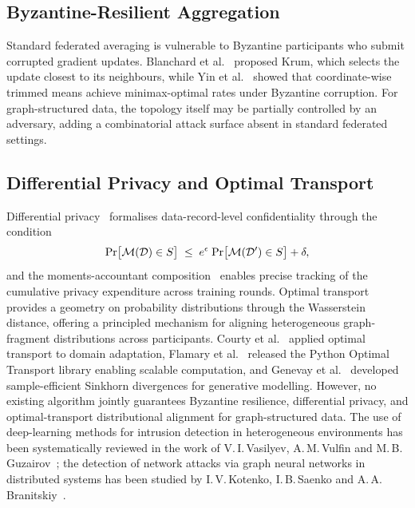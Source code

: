 \subsection{Byzantine-Resilient Aggregation}

Standard federated averaging is vulnerable to Byzantine participants who submit corrupted gradient updates. Blanchard et al.~\cite{Blanchard2017} proposed Krum, which selects the update closest to its neighbours, while Yin et al.~\cite{Yin2018} showed that coordinate-wise trimmed means achieve minimax-optimal rates under Byzantine corruption. For graph-structured data, the topology itself may be partially controlled by an adversary, adding a combinatorial attack surface absent in standard federated settings.


\subsection{Differential Privacy and Optimal Transport}

Differential privacy~\cite{Dwork2006} formalises data-record-level confidentiality through the condition
\begin{equation}
\mathrm{Pr}\bigl[\mathcal{M}(\mathcal{D})\in S\bigr]
\;\le\;
e^{\epsilon}\;\mathrm{Pr}\bigl[\mathcal{M}(\mathcal{D}')\in S\bigr] + \delta,
\end{equation}
and the moments-accountant composition~\cite{Abadi2016} enables precise tracking of the cumulative privacy expenditure across training rounds. Optimal transport~\cite{Villani2009,Cuturi2013} provides a geometry on probability distributions through the Wasserstein distance, offering a principled mechanism for aligning heterogeneous graph-fragment distributions across participants. Courty et al.~\cite{Courty2017} applied optimal transport to domain adaptation, Flamary et al.~\cite{Flamary2021pot} released the Python Optimal Transport library enabling scalable computation, and Genevay et al.~\cite{Genevay2018} developed sample-efficient Sinkhorn divergences for generative modelling. However, no existing algorithm jointly guarantees Byzantine resilience, differential privacy, and optimal-transport distributional alignment for graph-structured data. The use of deep-learning methods for intrusion detection in heterogeneous environments has been systematically reviewed in the work of V.\,I.\,Vasilyev, A.\,M.\,Vulfin and M.\,B.\,Guzairov~\cite{Vasilyev2020idps}; the detection of network attacks via graph neural networks in distributed systems has been studied by I.\,V.\,Kotenko, I.\,B.\,Saenko and A.\,A.\,Branitskiy~\cite{Kotenko2021gnn}.

